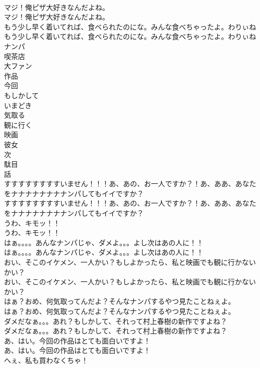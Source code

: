 \documentclass[8pt]{extreport}
\begin{document}
\begin{CJK}{UTF8}{min}
\\	マジ！俺ピザ大好きなんだよね。	
\\	マジ！俺ピザ大好きなんだよね。 
\\	もう少し早く着いてれば、食べられたのにな。みんな食べちゃったよ。わりぃね	
\\	もう少し早く着いてれば、食べられたのにな。みんな食べちゃったよ。わりぃね 
\\	ナンパ
\\	喫茶店
\\	大ファン
\\	作品
\\	今回
\\	もしかして
\\	いまどき
\\	気取る
\\	観に行く
\\	映画
\\	彼女
\\	次
\\	駄目
\\	話
\\	すすすすすすすすいません！！！あ、あの、お一人ですか？！あ、ああ、あなたをナナナナナナナナンパしてもイイですか？	
\\	すすすすすすすすいません！！！あ、あの、お一人ですか？！あ、ああ、あなたをナナナナナナナナンパしてもイイですか？ 
\\	うわ、キモッ！！	
\\	うわ、キモッ！！ 
\\	はぁ。。。。あんなナンパじゃ、ダメよ。。。よし次はあの人に！！	
\\	はぁ。。。。あんなナンパじゃ、ダメよ。。。よし次はあの人に！！ 
\\	おい、そこのイケメン、一人かい？もしよかったら、私と映画でも観に行かないかい？	
\\	おい、そこのイケメン、一人かい？もしよかったら、私と映画でも観に行かないかい？ 
\\	はぁ？おめ、何気取ってんだよ？そんなナンパするやつ見たことねぇよ。	
\\	はぁ？おめ、何気取ってんだよ？そんなナンパするやつ見たことねぇよ。 
\\	ダメだなぁ。。。あれ？もしかして、それって村上春樹の新作ですよね？	
\\	ダメだなぁ。。。あれ？もしかして、それって村上春樹の新作ですよね？ 
\\	あ、はい。今回の作品はとても面白いですよ！	
\\	あ、はい。今回の作品はとても面白いですよ！ 
\\	へぇ、私も買わなくちゃ！	

\end{CJK}
\end{document}
